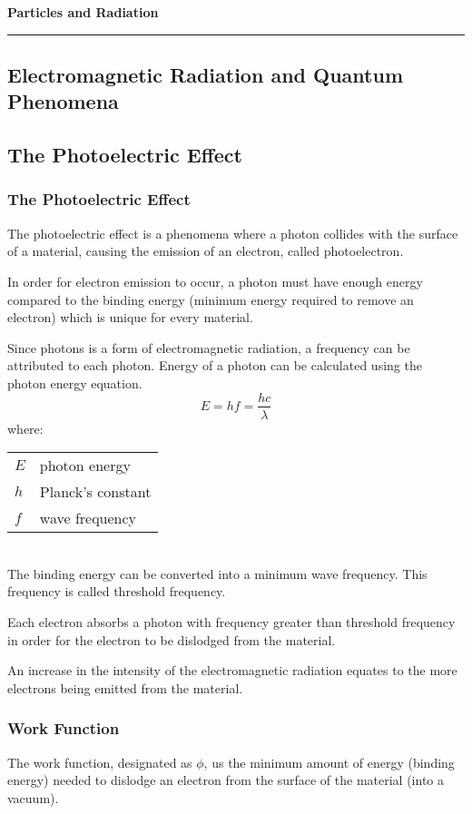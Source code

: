 \documentclass[a4paper,10pt]{article}
\makeatletter
\newenvironment{conditions}[1][where:]
  {#1 \begin{tabular}[t]{>{$}l<{$} @{${}={}$} l}}
  {\end{tabular}\\[\belowdisplayskip]}
\makeatother
\begin{document}
{\LARGE\bfseries Particles and Radiation}

\vspace*{8pt}\hrule\vspace*{8pt}

\begin{multicols*}{2}
	\tableofcontents

	\section{Electromagnetic Radiation and Quantum Phenomena}
	\subsection{The Photoelectric Effect}
	\subsubsection{The Photoelectric Effect}
	The photoelectric effect is a phenomena where a photon collides with the surface of a material, causing the emission of an electron, called photoelectron.
	\medskip

	In order for electron emission to occur, a photon must have enough energy compared to the binding energy (minimum energy required to remove an electron) which is unique for every material.
	\medskip

	Since photons is a form of electromagnetic radiation, a frequency can be attributed to each photon. Energy of a photon can be calculated using the photon energy equation.
	\begin{equation}
		E = hf = \dfrac{hc}{\lambda}
	\end{equation}
	\begin{conditions}
		E & photon energy \\
		h & Planck's constant \\
		f & wave frequency
	\end{conditions}
	The binding energy can be converted into a minimum wave frequency. This frequency is called threshold frequency.
	\medskip

	Each electron absorbs a photon with frequency greater than threshold frequency in order for the electron to be dislodged from the material.
	\medskip

	An increase in the intensity of the electromagnetic radiation equates to the more electrons being emitted from the material.

	\subsubsection{Work Function}
	The work function, designated as $\phi$, us the minimum amount of energy (binding energy) needed to dislodge an electron from the surface of the material (into a vacuum).


\end{multicols*}
\end{document}
